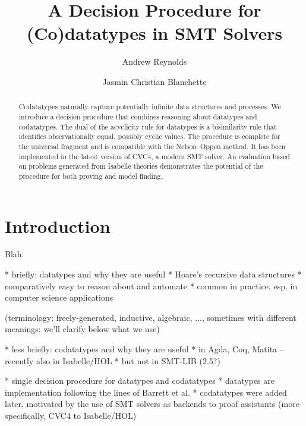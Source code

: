 \documentclass[a4paper,oribibl,envcountsame,draft]{llncs}
\begin{document}
\title{A Decision Procedure for (Co)datatypes in SMT Solvers}

\author {Andrew Reynolds \and Jasmin Christian Blanchette}

\maketitle

\begin{abstract}
Codatatypes naturally capture potentially infinite data structures and
processes. We introduce a decision procedure that combines reasoning about
datatypes and codatatypes. The dual of the acyclicity rule for datatypes is a
bisimilarity rule that identifies observationally equal, possibly cyclic values.
The procedure is complete for the universal fragment and is compatible with the
Nelson--Oppen method. It has been implemented in the latest version of CVC4, a
modern SMT solver. An evaluation based on problems generated from Isabelle
theories demonstrates the potential of the procedure for both proving and model
finding.
\end{abstract}

\setcounter{footnote}{0}

\section{Introduction}
\label{sec:introduction}

Blah.

  * briefly: datatypes and why they are useful
    * Hoare's recursive data structures
    * comparatively easy to reason about and automate
    * common in practice, esp. in computer science applications

    (terminology: freely-generated, inductive, algebraic, ..., sometimes
    with different meanings; we'll clarify below what we use)

  * less briefly: codatatypes and why they are useful
    * in Agda, Coq, Matita -- recently also in Isabelle/HOL
    * but not in SMT-LIB (2.5?)

  * single decision procedure for datatypes and codatatypes
  * datatypes are implementation following the lines of Barrett et al.
  * codatatypes were added later, motivated by the use of SMT solvers as
    backends to proof assistants (more specifically, CVC4 to Isabelle/HOL)
\end{document}
